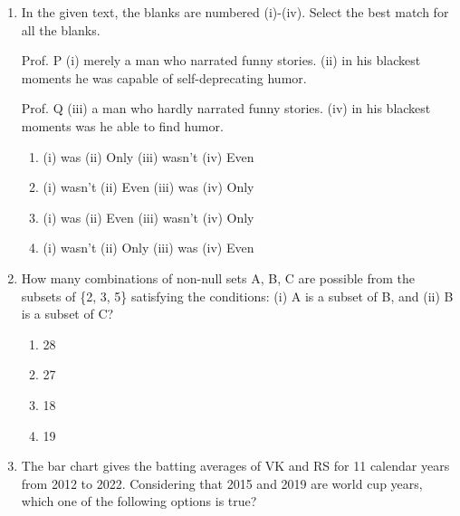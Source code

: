 \documentclass[journal,11pt,onecolumn]{IEEEtran}
\begin{document}
\begin{enumerate}[resume]

    \item In the given text, the blanks are numbered (i)-(iv). Select the best match for all the blanks.

          Prof. P \underline{\hspace{2cm}}(i)\underline{\hspace{2cm}} merely a man who narrated funny stories. \underline{\hspace{2cm}}(ii)\underline{\hspace{2cm}} in his blackest moments he was capable of self-deprecating humor.

          Prof. Q \underline{\hspace{2cm}}(iii)\underline{\hspace{2cm}} a man who hardly narrated funny stories. \underline{\hspace{2cm}}(iv)\underline{\hspace{2cm}} in his blackest moments was he able to find humor.

          \begin{enumerate}
              \item (i) was (ii) Only (iii) wasn't (iv) Even
              \item (i) wasn't (ii) Even (iii) was (iv) Only
              \item (i) was (ii) Even (iii) wasn't (iv) Only
              \item (i) wasn't (ii) Only (iii) was (iv) Even
          \end{enumerate}

    \item How many combinations of non-null sets A, B, C are possible from the subsets of \{2, 3, 5\} satisfying the conditions: (i) A is a subset of B, and (ii) B is a subset of C?

          \begin{enumerate}
              \item 28
              \item 27
              \item 18
              \item 19
          \end{enumerate}

    \item The bar chart gives the batting averages of VK and RS for 11 calendar years from 2012 to 2022. Considering that 2015 and 2019 are world cup years, which one of the following options is true?


\end{enumerate}
\end{document}
